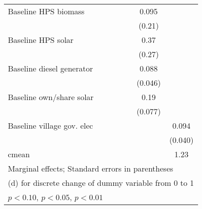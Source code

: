 \begin{table}[htbp]
\begin{tabular*}{1\hsize}{@{\hskip\tabcolsep\extracolsep\fill}l*{6}{c}}
Baseline HPS biomass&                  &                  &                  &                  &    0.095         &                  \\
                &                  &                  &                  &                  &   (0.21)         &                  \\
Baseline HPS solar&                  &                  &                  &                  &     0.37         &                  \\
                &                  &                  &                  &                  &   (0.27)         &                  \\
Baseline diesel generator&                  &                  &                  &                  &    0.088\sym{*}  &                  \\
                &                  &                  &                  &                  &  (0.046)         &                  \\
Baseline own/share solar&                  &                  &                  &                  &     0.19\sym{**} &                  \\
                &                  &                  &                  &                  &  (0.077)         &                  \\
Baseline village gov. elec&                  &                  &                  &                  &                  &    0.094\sym{**} \\
                &                  &                  &                  &                  &                  &  (0.040)         \\
\midrule
cmean           &                  &                  &                  &                  &                  &     1.23         \\
\bottomrule
\multicolumn{7}{l}{\footnotesize Marginal effects; Standard errors in parentheses}\\
\multicolumn{7}{l}{\footnotesize  (d) for discrete change of dummy variable from 0 to 1}\\
\multicolumn{7}{l}{\footnotesize \sym{*} \(p<0.10\), \sym{**} \(p<0.05\), \sym{***} \(p<0.01\)}\\
\end{tabular*}
\end{table}
